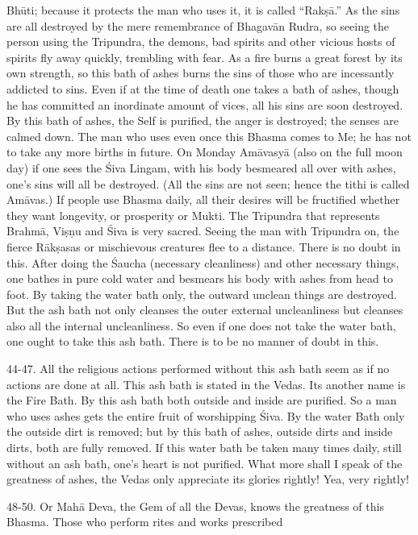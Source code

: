 Bh\=uti; because it protects the man who uses it, it is called ``Rak\d{s}\=a.'' As the sins are all destroyed by the mere remembrance of Bhagav\=an Rudra, so seeing the person using the Tripundra, the demons, bad spirits and other vicious hosts of spirits fly away quickly, trembling with fear. As a fire burns a great forest by its own strength, so this bath of ashes burns the sins of those who are incessantly addicted to sins. Even if at the time of death one takes a bath of ashes, though he has committed an inordinate amount of vices, all his sins are soon destroyed. By this bath of ashes, the Self is purified, the anger is destroyed; the senses are calmed down. The man who uses even once this Bhasma comes to Me; he has not to take any more births in future. On Monday Am\=avasy\=a (also on the full moon day) if one sees the \'Siva Lingam, with his body besmeared all over with ashes, one's sins will all be destroyed. (All the sins are not seen; hence the tithi is called Am\=avas.) If people use Bhasma daily, all their desires will be fructified whether they want longevity, or prosperity or Mukti. The Tripundra that represents Brahm\=a, Vi\d{s}\d{n}u and \'Siva is very sacred. Seeing the man with Tripundra on, the fierce R\=ak\d{s}asas or mischievous creatures flee to a distance. There is no doubt in this. After doing the \'Saucha (necessary cleanliness) and other necessary things, one bathes in pure cold water and besmears his body with ashes from head to foot. By taking the water bath only, the outward unclean things are destroyed. But the ash bath not only cleanses the outer external uncleanliness but cleanses also all the internal uncleanliness. So even if one does not take the water bath, one ought to take this ash bath. There is to be no manner of doubt in this.

44-47. All the religious actions performed without this ash bath seem as if no actions are done at all. This ash bath is stated in the Vedas. Its another name is the Fire Bath. By this ash bath both outside and inside are purified. So a man who uses ashes gets the entire fruit of worshipping \'Siva. By the water Bath only the outside dirt is removed; but by this bath of ashes, outside dirts and inside dirts, both are fully removed. If this water bath be taken many times daily, still without an ash bath, one's heart is not purified. What more shall I speak of the greatness of ashes, the Vedas only appreciate its glories rightly! Yea, very rightly!

48-50. Or Mah\=a Deva, the Gem of all the Devas, knows the greatness of this Bhasma. Those who perform rites and works prescribed

